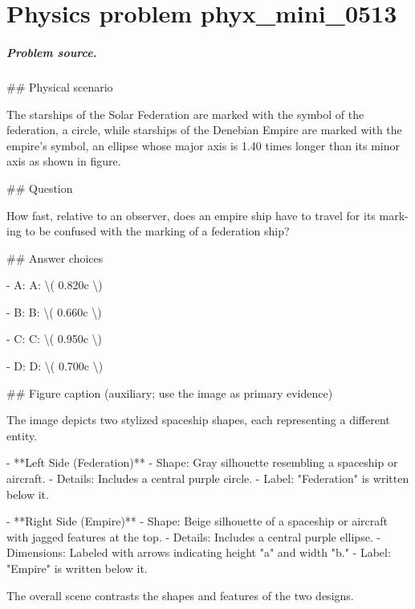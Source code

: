 
\chapter{Physics problem phyx\_mini\_0513}
\label{ch:PhyXMiniProblems_problem_phyx_mini_0513}

\paragraph{Problem source.}
\#\# Physical scenario

The starships of the Solar Federation are marked with the symbol of the federation, a circle, while starships of the Denebian Empire are marked with the empire's symbol, an ellipse whose major axis is 1.40 times longer than its minor axis as shown in figure.

\#\# Question

How fast, relative to an observer, does an empire ship have to travel for its mark- ing to be confused with the marking of a federation ship?

\#\# Answer choices

- A: A: \textbackslash{}( 0.820c \textbackslash{})

- B: B: \textbackslash{}( 0.660c \textbackslash{})

- C: C: \textbackslash{}( 0.950c \textbackslash{})

- D: D: \textbackslash{}( 0.700c \textbackslash{})

\#\# Figure caption (auxiliary; use the image as primary evidence)

The image depicts two stylized spaceship shapes, each representing a different entity.

- **Left Side (Federation)**
  - Shape: Gray silhouette resembling a spaceship or aircraft.
  - Details: Includes a central purple circle.
  - Label: "Federation" is written below it.

- **Right Side (Empire)**
  - Shape: Beige silhouette of a spaceship or aircraft with jagged features at the top.
  - Details: Includes a central purple ellipse.
  - Dimensions: Labeled with arrows indicating height "a" and width "b."
  - Label: "Empire" is written below it. 

The overall scene contrasts the shapes and features of the two designs.


